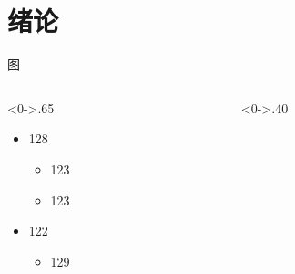 \documentclass{beamer}%
\begin{document}
	\section{绪论}
	   \begin{frame}{图}
		\begin{columns}[T] %
			\begin{column}<0->{.65\textwidth}
				\begin{itemize}
					\item<1-> 128
						\begin{itemize}
							\item<1->123 
							\item<1-> 123
						\end{itemize}
					\item<2-> 122
						\begin{itemize}	
							\item<2-> 129
						\end{itemize}
				\end{itemize}
			\end{column}%
			\hfill%
			\begin{column}<0->{.40\textwidth}
				\begin{figure}[thpb]
					\centering
					\label{fig:campus}
				\end{figure}
			\end{column}%
		\end{columns}
	\end{frame}
	
\end{document}
